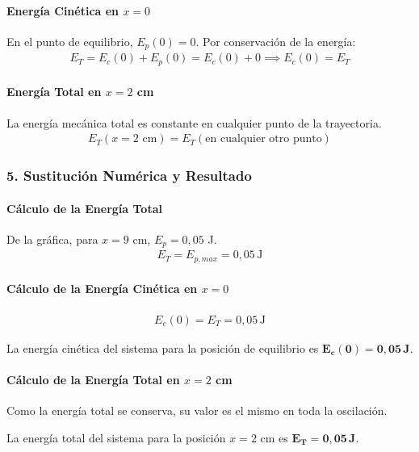 \paragraph*{Energía Cinética en $x=0$}
En el punto de equilibrio, $E_p(0)=0$. Por conservación de la energía:
\begin{gather}
    E_T = E_c(0) + E_p(0) = E_c(0) + 0 \implies E_c(0) = E_T
\end{gather}
\paragraph*{Energía Total en $x=2$ cm}
La energía mecánica total es constante en cualquier punto de la trayectoria.
\begin{gather}
    E_T(x=2\text{ cm}) = E_T(\text{en cualquier otro punto})
\end{gather}

\subsubsection*{5. Sustitución Numérica y Resultado}
\paragraph*{Cálculo de la Energía Total}
De la gráfica, para $x=9$ cm, $E_p = 0,05$ J.
\begin{gather}
    E_T = E_{p,max} = 0,05 \, \text{J}
\end{gather}
\paragraph*{Cálculo de la Energía Cinética en $x=0$}
\begin{gather}
    E_c(0) = E_T = 0,05 \, \text{J}
\end{gather}
\begin{cajaresultado}
    La energía cinética del sistema para la posición de equilibrio es $\boldsymbol{E_c(0) = 0,05 \, \textbf{J}}$.
\end{cajaresultado}
\paragraph*{Cálculo de la Energía Total en $x=2$ cm}
Como la energía total se conserva, su valor es el mismo en toda la oscilación.
\begin{cajaresultado}
    La energía total del sistema para la posición $x=2$ cm es $\boldsymbol{E_T = 0,05 \, \textbf{J}}$.
\end{cajaresultado}

